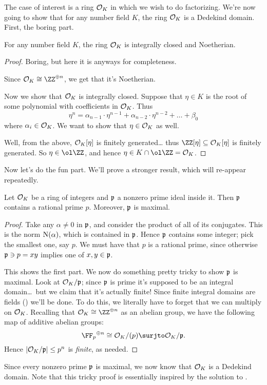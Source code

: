 The case of interest is a ring $\mathcal O_K$ in which we wish to do factorizing.
We're now going to show that for any number field $K$, the ring $\mathcal O_K$ is a Dedekind domain.
First, the boring part.
\begin{proposition}
	For any number field $K$, the ring $\mathcal O_K$ is integrally closed and Noetherian.
\end{proposition}
\begin{proof}
	Boring, but here it is anyways for completeness.

	Since $\OO_K \cong \ZZ^{\oplus n}$, we get that it's Noetherian.

	Now we show that $\mathcal O_K$ is integrally closed.
	Suppose that $\eta \in K$ is the root of some polynomial with coefficients in $\mathcal O_K$.
	Thus
	\[ \eta^n = \alpha_{n-1} \cdot \eta^{n-1} + \alpha_{n-2} \cdot \eta^{n-2} + \dots + \beta_0 \] 
	where $\alpha_i \in \mathcal O_K$. We want to show that $\eta \in \mathcal O_K$ as well.

	Well, from the above, $\mathcal O_K[\eta]$ is finitely generated\dots
	thus $\ZZ[\eta] \subseteq \OO_K[\eta]$ is finitely generated.
	So $\eta \in \ol\ZZ$, and hence $\eta \in K \cap \ol\ZZ = \OO_K$.
\end{proof}
Now let's do the fun part.
We'll prove a stronger result, which will re-appear repeatedly.
\begin{theorem}
	Let $\mathcal O_K$ be a ring of integers and $\mathfrak p$ a nonzero prime ideal inside it.
	Then $\mathfrak p$ contains a rational prime $p$. Moreover, $\mathfrak p$ is maximal.
\end{theorem}
\begin{proof}
	Take any $\alpha \neq 0$ in $\mathfrak p$, and consider the product of all of its conjugates.
	This is the norm $\operatorname{N}(\alpha)$, which is contained in $\mathfrak p$.
	Hence $\mathfrak p$ contains some integer; pick the smallest one, say $p$.
	We must have that $p$ is a rational prime, since otherwise $\mathfrak p \ni p = xy$
	implies one of $x,y \in \mathfrak p$.
	
	This shows the first part.
	We now do something pretty tricky to show $\mathfrak p$ is maximal.
	Look at $\mathcal O_K / \mathfrak p$; since $\mathfrak p$ is prime it's supposed to be an integral domain\dots\ 
	but we claim that it's actually finite! Since finite integral domains are fields ()
	we'll be done.
	To do this, we literally have to forget that we can multiply on $\mathcal O_K$.
	Recalling that $\OO_K \cong \ZZ^{\oplus n}$ as an abelian group, we have the following map of
	additive abelian groups:
	\[ {\FF_p}^{\oplus n} \cong \OO_K / (p) \surjto \OO_K / \pp. \]
	Hence $\left\lvert \mathcal O_K / \mathfrak p \right\rvert \le p^n$ is \emph{finite}, as needed.
\end{proof}
Since every nonzero prime $\mathfrak p$ is maximal, we now know that $\mathcal O_K$ is a Dedekind domain.
Note that this tricky proof is essentially inspired by the solution to .

